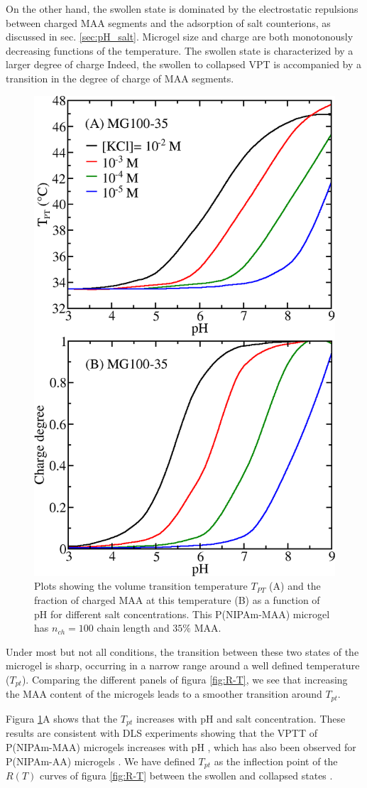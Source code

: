 On the other hand, the swollen state is dominated by the electrostatic repulsions between charged MAA segments and the adsorption of salt counterions, as discussed in sec. \ref{sec:pH_salt}.
Microgel size and charge are both monotonously decreasing functions of 
the temperature.
The swollen state is characterized by a larger degree of charge %
Indeed, the swollen to collapsed VPT is accompanied by a transition in the degree of charge of MAA segments.


\begin{figure}[!htb]
	\centering
	\includegraphics[width=0.5\linewidth]{Figures/graph-gel/Tpt-pH.png}
	\caption{Plots showing the volume transition temperature $T_{PT}$ (A) and the fraction of charged MAA at this temperature (B) as a function of pH for different salt concentrations.
		This P(NIPAm-MAA) microgel has $n_{ch}=100$ chain length and $35\%$ MAA.}
	\label{fig:Tpt-pH}
\end{figure}



Under most but not all conditions, the transition between these two states of the microgel is sharp, occurring in a narrow range around a well defined temperature ($T_{pt}$).
Comparing the different panels of figura \ref{fig:R-T}, we see that increasing the MAA content of the microgels leads to a smoother transition around $T_{pt}$.



Figura \ref{fig:Tpt-pH}A shows that the $T_{pt}$ increases with pH and salt concentration.
These results are consistent with DLS experiments showing that the VPTT of P(NIPAm-MAA) microgels increases with pH \addcite[Kleinen2008], which has also been observed for P(NIPAm-AA) microgels \addcite[CaprilesGonzalez2008].
We have defined $T_{pt}$ as the inflection point of the $R(T)$ curves of figura \ref{fig:R-T} between the swollen and collapsed states \addcite[Kratz2001].






